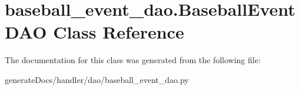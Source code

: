 \hypertarget{classbaseball__event__dao_1_1_baseball_event_d_a_o}{}\section{baseball\+\_\+event\+\_\+dao.\+Baseball\+Event\+D\+AO Class Reference}
\label{classbaseball__event__dao_1_1_baseball_event_d_a_o}


The documentation for this class was generated from the following file\+:\begin{DoxyCompactItemize}
\item 
generate\+Docs/handler/dao/baseball\+\_\+event\+\_\+dao.\+py\end{DoxyCompactItemize}
